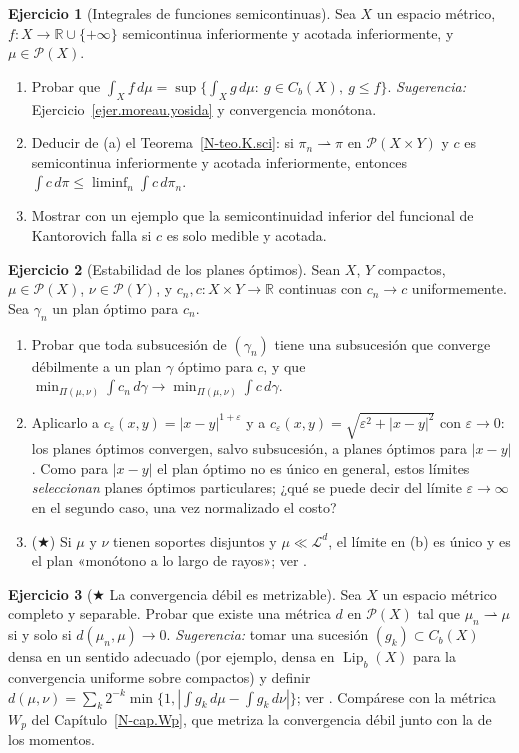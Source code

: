 \documentclass[11pt,a4paper]{amsart}
\newcounter{chapter}
\newcommand{\ve}{\varepsilon}
\newcommand{\R}{{\mathbb R}}
\newcommand{\LL}{{\mathcal L}}
\theoremstyle{remark}
\theoremstyle{definition}
\newtheorem{ejercicio}{Ejercicio}[chapter]
\numberwithin{subsection}{section}
\numberwithin{equation}{section}
\begin{document}
\begin{ejercicio}[Integrales de funciones semicontinuas]\label{ejer.sci.integral}
Sea $X$ un espacio métrico, $f\colon X\to\R\cup\{+\infty\}$ semicontinua
inferiormente y acotada inferiormente, y $\mu\in\mathcal P(X)$.
\begin{enumerate}[label=(\alph*)]
\item Probar que
$\int_Xf\,d\mu=\sup\bigl\{\int_Xg\,d\mu:\ g\in C_b(X),\ g\le f\bigr\}$.
\emph{Sugerencia:} Ejercicio~\ref{ejer.moreau.yosida} y convergencia
monótona.
\item Deducir de (a) el Teorema~\ref{N-teo.K.sci}: si $\pi_n\rightharpoonup\pi$
en $\mathcal P(X\times Y)$ y $c$ es semicontinua inferiormente y acotada
inferiormente, entonces $\int c\,d\pi\le\liminf_n\int c\,d\pi_n$.
\item Mostrar con un ejemplo que la semicontinuidad inferior del funcional
de Kantorovich falla si $c$ es solo medible y acotada.
\end{enumerate}
\end{ejercicio}

\begin{ejercicio}[Estabilidad de los planes óptimos]\label{ejer.estabilidad.costos}
Sean $X$, $Y$ compactos, $\mu\in\mathcal P(X)$, $\nu\in\mathcal P(Y)$, y
$c_n,c\colon X\times Y\to\R$ continuas con $c_n\to c$ uniformemente. Sea
$\gamma_n$ un plan óptimo para $c_n$.
\begin{enumerate}[label=(\alph*)]
\item Probar que toda subsucesión de $(\gamma_n)$ tiene una subsucesión que
converge débilmente a un plan $\gamma$ óptimo para $c$, y que
$\min_{\Pi(\mu,\nu)}\int c_n\,d\gamma\to\min_{\Pi(\mu,\nu)}\int c\,d\gamma$.
\item Aplicarlo a $c_\ve(x,y)=|x-y|^{1+\ve}$ y a
$c_\ve(x,y)=\sqrt{\ve^2+|x-y|^2}$ con $\ve\to0$: los planes óptimos
convergen, salvo subsucesión, a planes óptimos para $|x-y|$. Como para
$|x-y|$ el plan óptimo no es único en general, estos límites
\emph{seleccionan} planes óptimos particulares; ¿qué se puede decir del
límite $\ve\to\infty$ en el segundo caso, una vez normalizado el costo?
\item ($\bigstar$) Si $\mu$ y $\nu$ tienen soportes disjuntos y
$\mu\ll\LL^d$, el límite en (b) es único y es el plan «monótono a lo largo
de rayos»; ver \cite[Sec.~3.1]{Santambrogio}.
\end{enumerate}
\end{ejercicio}

\begin{ejercicio}[$\bigstar$ La convergencia débil es metrizable]\label{ejer.debil.metrizable}
Sea $X$ un espacio métrico completo y separable. Probar que existe una
métrica $d$ en $\mathcal P(X)$ tal que $\mu_n\rightharpoonup\mu$ si y solo
si $d(\mu_n,\mu)\to0$. \emph{Sugerencia:} tomar una sucesión
$(g_k)\subset C_b(X)$ densa en un sentido adecuado (por ejemplo, densa en
$\operatorname{Lip}_b(X)$ para la convergencia uniforme sobre compactos) y
definir $d(\mu,\nu)=\sum_k2^{-k}\min\{1,|\int g_k\,d\mu-\int g_k\,d\nu|\}$;
ver \cite[Sec.~5.1]{AGS2008}. Compárese con la métrica $W_p$ del
Capítulo~\ref{N-cap.Wp}, que metriza la convergencia débil junto con la de
los momentos.
\end{ejercicio}
\end{document}
